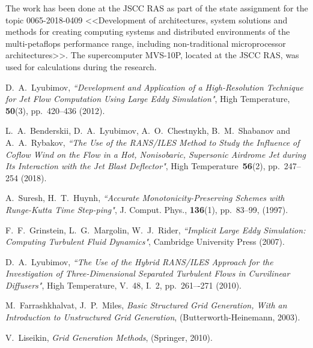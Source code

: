 \documentclass[
11pt,%
tightenlines,%
twoside,%
onecolumn,%
nofloats,%
nobibnotes,%
nofootinbib,%
superscriptaddress,%
noshowpacs,%
centertags]%
{revtex4}
\begin{document}
\begin{acknowledgments}
The work has been done at the JSCC RAS as part of the state assignment for the topic 0065-2018-0409 <<Development of architectures, system solutions and methods for creating computing systems and distributed environments of the multi-petaflops performance range, including non-traditional microprocessor architectures>>. The supercomputer MVS-10P, located at the JSCC RAS, was used for calculations during the research.
\end{acknowledgments}

\begin{thebibliography}{99}


D.~A.~Lyubimov, {\it ``Development and Application of a High-Resolution Technique for Jet Flow Computation Using Large Eddy Simulation"}, High Temperature, {\bf 50}(3), pp.~420--436 (2012).

L.~A.~Benderskii, D.~A.~Lyubimov, A.~O.~Chestnykh, B.~M.~Shabanov and A.~A.~Rybakov, {\it ``The Use of the RANS/ILES Method to Study the Influence of Coflow Wind on the Flow in a Hot, Nonisobaric, Supersonic Airdrome Jet during Its Interaction with the Jet Blast Deflector"}, High Temperature~{\bf 56}(2), pp.~247--254 (2018).

A.~Suresh, H.~T.~Huynh, {\it ``Accurate Monotonicity-Preserving Schemes with Runge-Kutta Time Step-ping"}, J. Comput. Phys., {\bf 136}(1), pp.~83--99, (1997).

F.~F.~Grinstein, L.~G.~Margolin, W.~J.~Rider, {\it ``Implicit Large Eddy Simulation: Computing Turbulent Fluid Dynamics"}, Cambridge University Press (2007).


D.~A.~Lyubimov, {\it ``The Use of the Hybrid RANS/ILES Approach for the Investigation of Three-Dimensional Separated Turbulent Flows in Curvilinear Diffusers"}, High Temperature, V.~48, I.~2, pp.~261–-271 (2010).


M.~Farrashkhalvat, J.~P.~Miles, \emph{Basic Structured Grid Generation, With an Introduction to Unstructured Grid Generation}, (Butterworth-Heinemann, 2003).

V.~Liseikin, \emph{Grid Generation Methods}, (Springer, 2010).


\end{thebibliography}
\end{document}
